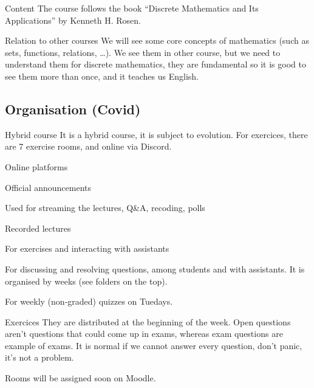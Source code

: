 \documentclass{article}
\begin{document}
\begin{parag}{Content}
    The course follows the book ``Discrete Mathematics and Its Applications'' by Kenneth H. Rosen.
\end{parag}

\begin{parag}{Relation to other courses}
    We will see some core concepts of mathematics (such as sets, functions, relations, \ldots). We see them in other course, but we need to understand them for discrete mathematics, they are fundamental so it is good to see them more than once, and it teaches us English.
\end{parag}

\subsection{Organisation (Covid)}
\begin{parag}{Hybrid course}
    It is a hybrid course, it is subject to evolution. For exercices, there are 7 exercise rooms, and online via Discord.
\end{parag}

\begin{parag}{Online platforms}
    \begin{description}[left=0pt]
    \item[Moodle] Official announcements
    \item[Zoom] Used for streaming the lectures, Q\&A, recoding, polls
    \item[Switchtube] Recorded lectures
    \item[Discord] For exercises and interacting with assistants
    \item[Piazza] For discussing and resolving questions, among students and with assistants. It is organised by weeks (see folders on the top).
    \item[Kahoot] For weekly (non-graded) quizzes on Tuedays.
\end{description}
\end{parag}

\begin{parag}{Exercices}
They are distributed at the beginning of the week. Open questions aren't questions that could come up in exams, whereas exam questions are example of exams. It is normal if we cannot answer every question, don't panic, it's not a problem.

Rooms will be assigned soon on Moodle.
\end{parag}
\end{document}
